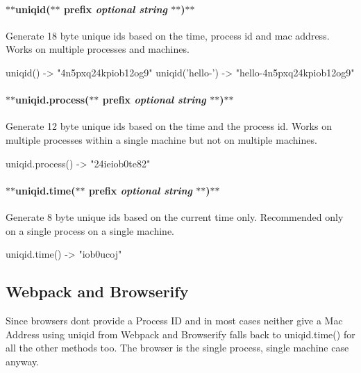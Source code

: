 \paragraph*{$\ast$$\ast$uniqid($\ast$$\ast$ prefix {\itshape optional string} $\ast$$\ast$)$\ast$$\ast$}

Generate 18 byte unique id\textquotesingle{}s based on the time, process id and mac address. Works on multiple processes and machines.


\begin{DoxyCode}
uniqid() -> "4n5pxq24kpiob12og9"
uniqid('hello-') -> "hello-4n5pxq24kpiob12og9"
\end{DoxyCode}


\paragraph*{$\ast$$\ast$uniqid.process($\ast$$\ast$ prefix {\itshape optional string} $\ast$$\ast$)$\ast$$\ast$}

Generate 12 byte unique id\textquotesingle{}s based on the time and the process id. Works on multiple processes within a single machine but not on multiple machines. 
\begin{DoxyCode}
uniqid.process() -> "24ieiob0te82"
\end{DoxyCode}


\paragraph*{$\ast$$\ast$uniqid.time($\ast$$\ast$ prefix {\itshape optional string} $\ast$$\ast$)$\ast$$\ast$}

Generate 8 byte unique id\textquotesingle{}s based on the current time only. Recommended only on a single process on a single machine.


\begin{DoxyCode}
uniqid.time() -> "iob0ucoj"
\end{DoxyCode}


\subsection*{Webpack and Browserify}

Since browsers don\textquotesingle{}t provide a Process ID and in most cases neither give a Mac Address using uniqid from Webpack and Browserify falls back to {\ttfamily uniqid.\+time()} for all the other methods too. The browser is the single process, single machine case anyway.


